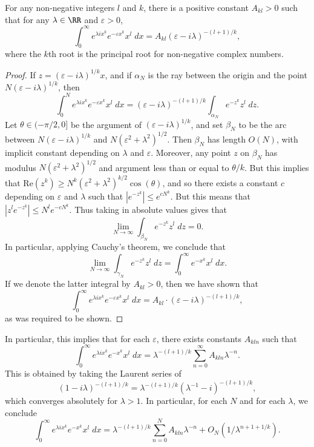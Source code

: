 \begin{lemma}
  For any non-negative integers $l$ and $k$, there is a positive constant $A_{kl} > 0$ such that for any $\lambda \in \RR$ and $\varepsilon > 0$,
  \[ \int_0^\infty e^{\lambda i x^k} e^{-\varepsilon x^k} x^l\; dx = A_{kl} (\varepsilon - i \lambda)^{-(l+1)/k}, \]
  where the $k$th root is the principal root for non-negative complex numbers.
\end{lemma}
\begin{proof}
  If $z = (\varepsilon - i \lambda)^{1/k} x$, and if $\alpha_N$ is the ray between the origin and the point $N (\varepsilon - i \lambda)^{1/k}$, then
  \[ \int_0^N e^{\lambda i x^k} e^{- \varepsilon x^k} x^l\; dx = (\varepsilon - i \lambda)^{-(l+1)/k} \int_{\alpha_N} e^{-z^k} z^l\; dz. \]
  Let $\theta \in (-\pi/2,0]$ be the argument of $(\varepsilon - i \lambda)^{1/k}$, and set $\beta_N$ to be the arc between $N ( \varepsilon - i \lambda)^{1/k}$ and $N (\varepsilon^2 + \lambda^2)^{1/2}$. Then $\beta_N$ has length $O(N)$, with implicit constant depending on $\lambda$ and $\varepsilon$. Moreover, any point $z$ on $\beta_N$ has modulus $N (\varepsilon^2 + \lambda^2)^{1/2}$ and argument less than or equal to $\theta / k$. But this implies that $\text{Re}(z^k) \geq N^k (\varepsilon^2 + \lambda^2)^{k/2} \cos(\theta)$, and so there exists a constant $c$ depending on $\varepsilon$ and $\lambda$ such that $|e^{-z^k}| \leq e^{c N^k}$. But this means that $|z^l e^{-z^k}| \leq N^l e^{-cN^k}$. Thus taking in absolute values gives that
  \[ \lim_{N \to \infty} \int_{\beta_N} e^{-z^k} z^l\; dz = 0. \]
  In particular, applying Cauchy's theorem, we conclude that
  \[ \lim_{N \to \infty} \int_{\gamma_N} e^{-z^k} z^l\; dz = \int_0^\infty e^{-x^k} x^l\; dx. \]
  If we denote the latter integral by $A_{kl} > 0$, then we have shown that
  \[ \int_0^\infty e^{\lambda i x^k} e^{-\varepsilon x^k} x^l\; dx = A_{kl} \cdot (\varepsilon - i \lambda)^{-(l+1)/k}, \]
  as was required to be shown.
\end{proof}

\begin{remark}
  In particular, this implies that for each $\varepsilon$, there exists constants $A_{kln}$ such that
  \[ \int_0^\infty e^{\lambda i x^k} e^{-x^k} x^l\; dx = \lambda^{-(l+1)/k} \sum_{n = 0}^\infty A_{kln} \lambda^{-n}. \]
  This is obtained by taking the Laurent series of
  \[ (1 - i\lambda)^{-(l+1)/k} = \lambda^{-(l+1)/k} (\lambda^{-1} - i)^{-(l+1)/k}, \]
  which converges absolutely for $\lambda > 1$. In particular, for each $N$ and for each $\lambda$, we conclude
  \[ \int_0^\infty e^{\lambda i x^k} e^{-x^k} x^l\; dx = \lambda^{-(l+1)/k} \sum_{n = 0}^N A_{kln} \lambda^{-n} + O_N \left(1/\lambda^{n + 1 + 1/k} \right). \]
\end{remark}

